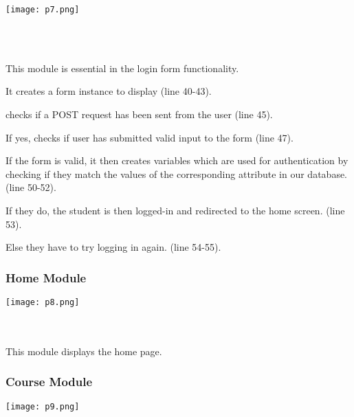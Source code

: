 \documentclass[10pt]{article}
\begin{document}
\begin{center}
\texttt{[image: p7.png]}
\end{center} \\ \\

\begin{description}[font=$\bullet$~\normalfont\scshape\color{red!50!black}]
\item [] This module is essential in the login form functionality. 
\item [] It creates a form instance to display (line 40-43).
\item [] checks if a POST request has been sent from the user (line 45).
\item [] If yes, checks if user has submitted valid input to the form (line 47).
\item [] If the form is valid, it then creates variables which are used for authentication by checking if they match the values of the corresponding attribute in our database. (line 50-52).
\item [] If they do, the student is then logged-in and redirected to the home screen. (line 53).
\item [] Else they have to try logging in again. (line 54-55).

\end{description}

\subsubsection{Home Module}

\begin{center}
\texttt{[image: p8.png]}
\end{center} \\ \\

This module displays the home page.


\subsubsection{Course Module}

\begin{center}
\texttt{[image: p9.png]}
\end{center} \\ \\
\end{document}
